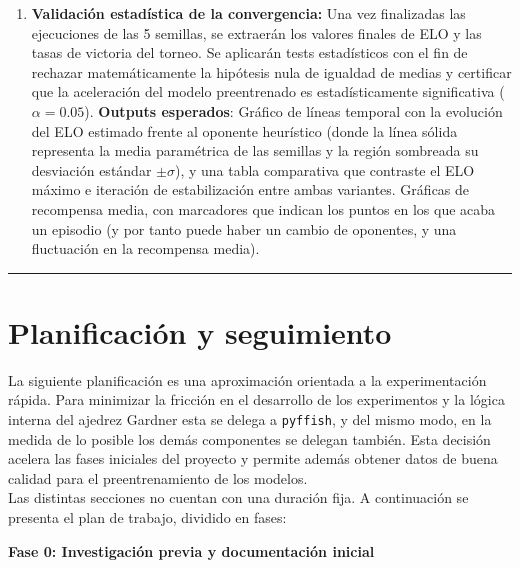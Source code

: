 \documentclass[12pt, a4paper]{article}
\begin{document}
\begin{enumerate}
Dado que la recompensa interna del buffer es una métrica móvil relativa al nivel del pool de oponentes, la verdadera fuerza de juego se monitorizará mediante evaluaciones externas estáticas. Cada 5 iteraciones de PPO, se pausará el entrenamiento de forma síncrona y el modelo congelado disputará un torneo cerrado de 40 partidas contra un agente aleatorio y el agente heurístico. A partir de los resultados de este torneo, se calculará la tasa de victoria y el ELO estimado del agente.
\item \textbf{Validación estadística de la convergencia:} Una vez finalizadas las ejecuciones de las 5 semillas, se extraerán los valores finales de ELO y las tasas de victoria del torneo. Se aplicarán tests estadísticos con el fin de rechazar matemáticamente la hipótesis nula de igualdad de medias y certificar que la aceleración del modelo preentrenado es estadísticamente significativa ($\alpha = 0.05$).
\textbf{Outputs esperados}: Gráfico de líneas temporal con la evolución del ELO estimado frente al oponente heurístico (donde la línea sólida representa la media paramétrica de las semillas y la región sombreada su desviación estándar $\pm\sigma$), y una tabla comparativa que contraste el ELO máximo e iteración de estabilización entre ambas variantes. Gráficas de recompensa media, con marcadores que indican los puntos en los que acaba un episodio (y por tanto puede haber un cambio de oponentes, y una fluctuación en la recompensa media).
\end{enumerate}

\rule{\textwidth}{0.2pt}
\section{Planificación y seguimiento}\label{sec:planificacion}

La siguiente planificación es una aproximación orientada a la experimentación rápida. Para minimizar la fricción en el desarrollo de los experimentos y la lógica interna del ajedrez Gardner esta se delega a \texttt{pyffish}, y del mismo modo, en la medida de lo posible los demás componentes se delegan también. Esta decisión acelera las fases iniciales del proyecto y permite además obtener datos de buena calidad para el preentrenamiento de los modelos. \\
Las distintas secciones no cuentan con una duración fija. 
A continuación se presenta el plan de trabajo, dividido en fases:

\textbf{Fase 0: Investigación previa y documentación inicial}
\end{document}
